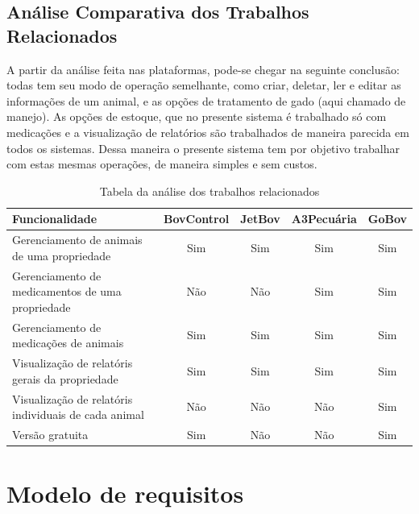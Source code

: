 \documentclass[12pt]{article}
\begin{document}

\subsection{Análise Comparativa dos Trabalhos Relacionados}

A partir da análise feita nas plataformas, pode-se chegar na seguinte conclusão: todas tem seu modo de operação semelhante, como criar, deletar, ler e editar as informações de um animal, e as opções de tratamento de gado (aqui chamado de manejo). As opções de estoque, que no presente sistema é trabalhado só com medicações e a visualização de relatórios são trabalhados de maneira parecida em todos os sistemas. Dessa maneira o presente sistema tem por objetivo trabalhar com estas mesmas operações, de maneira simples e sem custos.
\begin{table}[th]
	\begin{center}
		\caption{Tabela da análise dos trabalhos relacionados}
		\begin{tabular}{ | p{8cm} |  c | c | c | c |}
			\hline
			Funcionalidade & BovControl & JetBov & A3Pecuária & GoBov \\ \hline
			Gerenciamento de animais de uma propriedade & Sim & Sim & Sim & Sim \\  \hline
			Gerenciamento de medicamentos de uma propriedade & Não & Não & Sim & Sim  \\ \hline
			Gerenciamento de medicações de animais & Sim & Sim & Sim & Sim  \\ \hline
			Visualização de relatóris gerais da propriedade & Sim & Sim & Sim & Sim  \\ \hline
			Visualização de relatóris individuais de cada animal & Não & Não & Não & Sim  \\ \hline
			Versão gratuita & Sim & Não & Não & Sim  \\
			\hline
		\end{tabular}
	\end{center}
\end{table}

\newpage

\section{Modelo de requisitos}
\end{document}
